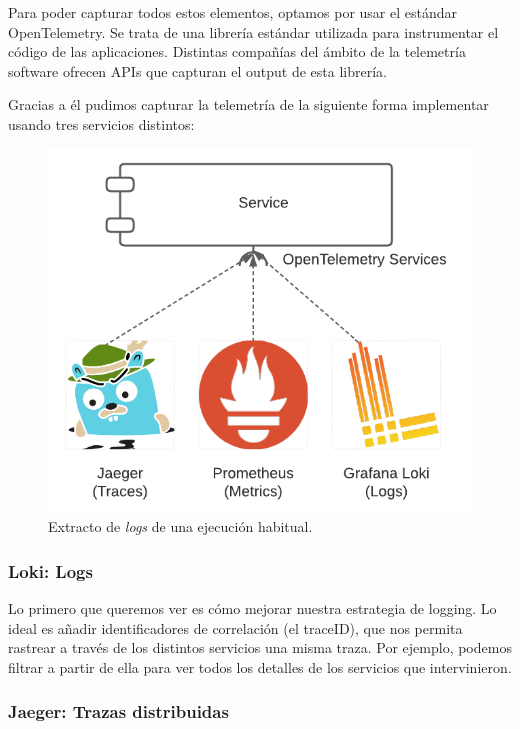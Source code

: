 Para poder capturar todos estos elementos, optamos por usar el estándar OpenTelemetry. Se trata de una librería estándar utilizada para instrumentar el código de las aplicaciones. Distintas compañías del ámbito de la telemetría software ofrecen APIs que capturan el output de esta librería.

Gracias a él pudimos capturar la telemetría de la siguiente forma implementar usando tres servicios distintos:

\begin{figure}[h]
  \centering
  \includegraphics[scale=0.75]{cap_caso-estudio/images/observability-telemetry-collection}
  \caption{Extracto de \emph{logs} de una ejecución habitual.}
  \label{fig:observability-telemetry-collection}
\end{figure}

\subsubsection{Loki: Logs}
Lo primero que queremos ver es cómo mejorar nuestra estrategia de logging. Lo ideal es añadir identificadores de correlación (el traceID), que nos permita rastrear a través de los distintos servicios una misma traza. Por ejemplo, podemos filtrar a partir de ella para ver todos los detalles de los servicios que intervinieron.

\subsubsection{Jaeger: Trazas distribuidas}

